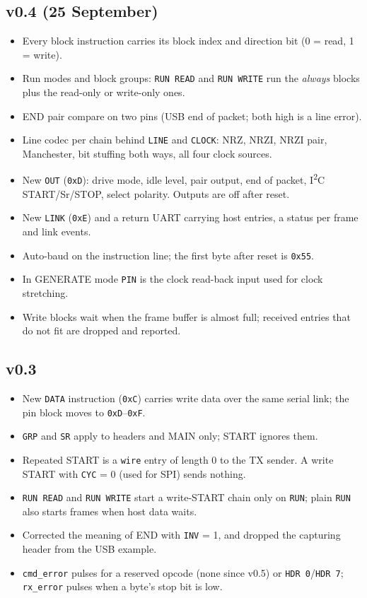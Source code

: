 \documentclass[11pt,a4paper]{article}
\newcommand{\sig}[1]{\texttt{#1}}
\begin{document}
\subsection{v0.4 (25 September)}\label{sec:changes}

\begin{itemize}
\item Every block instruction carries its block index and direction bit (0 = read, 1 = write).
\item Run modes and block groups: \sig{RUN READ} and \sig{RUN WRITE} run the \emph{always} blocks plus the read-only or write-only ones.
\item END pair compare on two pins (USB end of packet; both high is a line error).
\item Line codec per chain behind \sig{LINE} and \sig{CLOCK}: NRZ, NRZI, NRZI pair, Manchester, bit stuffing both ways, all four clock sources.
\item New \sig{OUT} (\texttt{0xD}): drive mode, idle level, pair output, end of packet, I\textsuperscript{2}C START/Sr/STOP, select polarity. Outputs are off after reset.
\item New \sig{LINK} (\texttt{0xE}) and a return UART carrying host entries, a status per frame and link events.
\item Auto-baud on the instruction line; the first byte after reset is \texttt{0x55}.
\item In GENERATE mode \sig{PIN} is the clock read-back input used for clock stretching.
\item Write blocks wait when the frame buffer is almost full; received entries that do not fit are dropped and reported.
\end{itemize}

\subsection{v0.3}

\begin{itemize}
\item New \sig{DATA} instruction (\texttt{0xC}) carries write data over the same serial link; the pin block moves to \texttt{0xD}--\texttt{0xF}.
\item \sig{GRP} and \sig{SR} apply to headers and MAIN only; START ignores them.
\item Repeated START is a \sig{wire} entry of length 0 to the TX sender. A write START with \sig{CYC} = 0 (used for SPI) sends nothing.
\item \sig{RUN READ} and \sig{RUN WRITE} start a write-START chain only on \sig{RUN}; plain \sig{RUN} also starts frames when host data waits.
\item Corrected the meaning of END with \sig{INV} = 1, and dropped the capturing header from the USB example.
\item \sig{cmd\_error} pulses for a reserved opcode (none since v0.5) or \sig{HDR 0}/\sig{HDR 7}; \sig{rx\_error} pulses when a byte's stop bit is low.
\end{itemize}
\end{document}
